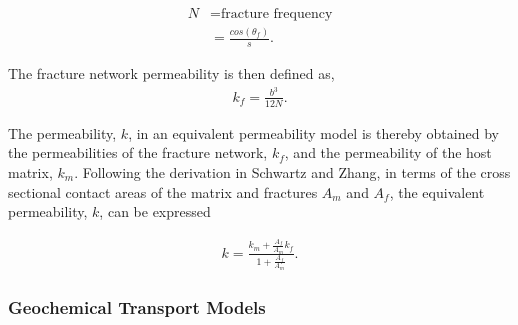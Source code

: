 \begin{align}
  N &= \mbox{fracture frequency}\nonumber\\
  &= \frac{cos(\theta_f)}{s}.
  \label{fracfreq}
\end{align}

The fracture network permeability is then defined as,
\begin{align}
  k_f = \frac{b^3}{12N}.
  \label{fracperm}
\end{align}

The permeability, $k$, in an equivalent permeability model is thereby obtained
by the permeabilities of the fracture network, $k_f$, and the permeability
of the host matrix, $k_m$. Following the derivation in Schwartz and Zhang, in 
terms of the cross sectional contact areas of the matrix and fractures 
$A_m$ and $A_f$, the equivalent permeability, $k$, can be expressed

\begin{align}
  k = \frac{k_m + \frac{A_f}{A_m}k_f}{1+\frac{A_f}{A_m}}.
  \label{equivperm}
\end{align}

\subsubsection{Geochemical Transport Models}






